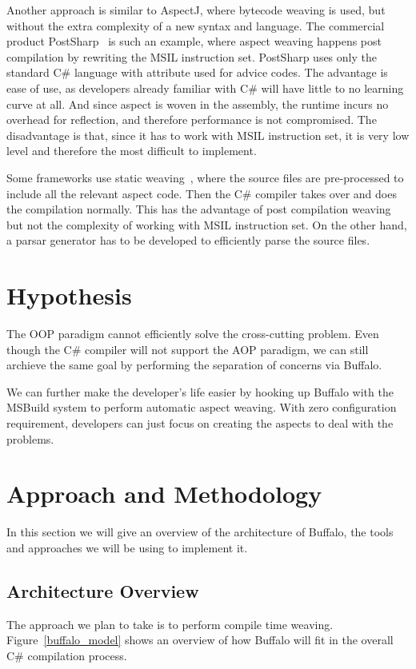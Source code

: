 Another approach is similar to AspectJ, where bytecode weaving is used, but without the extra complexity of a new syntax and language. The commercial product PostSharp~\cite{postsharp} is such an example, where aspect weaving happens post compilation by rewriting the MSIL instruction set. PostSharp uses only the standard C\# language with attribute used for advice codes. The advantage is ease of use, as developers already familiar with C\# will have little to no learning curve at all. And since aspect is woven in the assembly, the runtime incurs no overhead for reflection, and therefore performance is not compromised. The disadvantage is that, since it has to work with MSIL instruction set, it is very low level and therefore the most difficult to implement.

Some frameworks use static weaving~\cite{aspectcs}, where the source files are pre-processed to include all the relevant aspect code. Then the C\# compiler takes over and does the compilation normally. This has the advantage of post compilation weaving but not the complexity of working with MSIL instruction set. On the other hand, a parsar generator has to be developed to efficiently parse the source files.

\section{Hypothesis}
The OOP paradigm cannot efficiently solve the cross-cutting problem. Even though the C\# compiler will not support the AOP paradigm, we can still archieve the same goal by performing the separation of concerns via Buffalo.

We can further make the developer's life easier by hooking up Buffalo with the MSBuild system to perform automatic aspect weaving. With zero configuration requirement, developers can just focus on creating the aspects to deal with the problems.

\section{Approach and Methodology}
In this section we will give an overview of the architecture of Buffalo, the tools and approaches we will be using to implement it.

\subsection{Architecture Overview}
The approach we plan to take is to perform compile time weaving. Figure~\ref{buffalo_model} shows an overview of how Buffalo will fit in the overall C\# compilation process.

